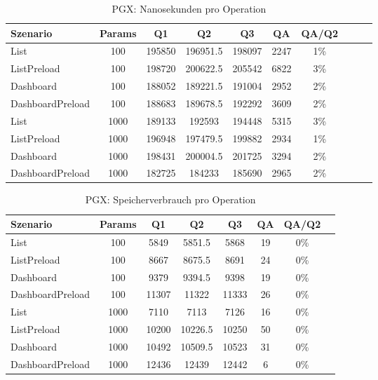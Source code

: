 
\begin{table}[ht]
\centering
\caption{PGX: Nanosekunden pro Operation}
\begin{tabular}{lccccccccc}
\toprule
Szenario & Params & Q1 & Q2 & Q3 & QA & QA/Q2 \\
\midrule
	List & 100 & 195850 & 196951.5 & 198097 & 2247 & 1\% \\
	ListPreload & 100 & 198720 & 200622.5 & 205542 & 6822 & 3\% \\
	Dashboard & 100 & 188052 & 189221.5 & 191004 & 2952 & 2\% \\
	DashboardPreload & 100 & 188683 & 189678.5 & 192292 & 3609 & 2\% \\
	List & 1000 & 189133 & 192593 & 194448 & 5315 & 3\% \\
	ListPreload & 1000 & 196948 & 197479.5 & 199882 & 2934 & 1\% \\
	Dashboard & 1000 & 198431 & 200004.5 & 201725 & 3294 & 2\% \\
	DashboardPreload & 1000 & 182725 & 184233 & 185690 & 2965 & 2\% \\
\bottomrule
\end{tabular}
\label{tab:benchmark_pgx_nsperop}
\end{table}
	
\begin{table}[ht]
\centering
\caption{PGX: Speicherverbrauch pro Operation}
\begin{tabular}{lccccccc}
\toprule
Szenario & Params & Q1 & Q2 & Q3 & QA & QA/Q2 \\
\midrule
	List & 100 & 5849 & 5851.5 & 5868 & 19 & 0\% \\
	ListPreload & 100 & 8667 & 8675.5 & 8691 & 24 & 0\% \\
	Dashboard & 100 & 9379 & 9394.5 & 9398 & 19 & 0\% \\
	DashboardPreload & 100 & 11307 & 11322 & 11333 & 26 & 0\% \\
	List & 1000 & 7110 & 7113 & 7126 & 16 & 0\% \\
	ListPreload & 1000 & 10200 & 10226.5 & 10250 & 50 & 0\% \\
	Dashboard & 1000 & 10492 & 10509.5 & 10523 & 31 & 0\% \\
	DashboardPreload & 1000 & 12436 & 12439 & 12442 & 6 & 0\% \\
\bottomrule
\end{tabular}
\label{tab:benchmark_pgx_bytesperop}
\end{table}
	
